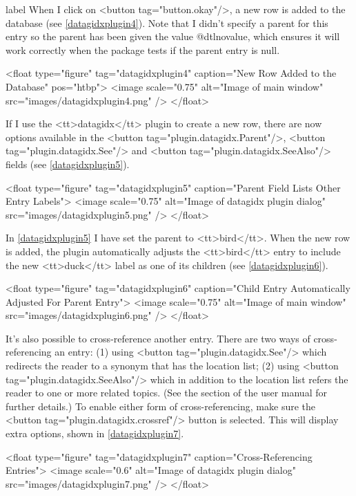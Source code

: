 \begin{example}{label}{}
   When I click on <button tag="button.okay"/>, a new row is
   added to the database (see \autoref{datagidxplugin4}). Note that
   I didn't specify a parent for this entry so the parent has
   been given the value \gls{@dtlnovalue}, which ensures it will work
   correctly when the  package tests if the parent entry
   is null.

     <float type="figure" tag="datagidxplugin4" caption="New Row Added to the Database" pos="htbp">
      <image scale="0.75" alt="Image of main window" src="images/datagidxplugin4.png" />
     </float>

   If I use the <tt>datagidx</tt> plugin to create a new row,
   there are now options available in the 
   <button tag="plugin.datagidx.Parent"/>, 
   <button tag="plugin.datagidx.See"/> and 
   <button tag="plugin.datagidx.SeeAlso"/> fields 
   (see \autoref{datagidxplugin5}).

     <float type="figure" tag="datagidxplugin5" caption="Parent Field Lists Other Entry Labels">
      <image scale="0.75" alt="Image of datagidx plugin dialog" src="images/datagidxplugin5.png" />
     </float>

   In \autoref{datagidxplugin5} I have set the parent to 
   <tt>bird</tt>. When the new row is added, the plugin automatically adjusts
   the <tt>bird</tt> entry to include the new <tt>duck</tt> label as one of its
   children (see \autoref{datagidxplugin6}).

     <float type="figure" tag="datagidxplugin6" caption="Child Entry Automatically Adjusted For Parent Entry">
      <image scale="0.75" alt="Image of main window" src="images/datagidxplugin6.png" />
     </float>

   It's also possible to cross-reference another entry. There are two ways
   of cross-referencing an entry: (1) using <button tag="plugin.datagidx.See"/>
   which redirects the reader to a synonym that has the location list;
   (2) using <button tag="plugin.datagidx.SeeAlso"/> which in addition to the
   location list refers the reader to one or more related topics. (See the
    section of the  user manual
   for further details.) To enable
   either form of cross-referencing, make sure the
   <button tag="plugin.datagidx.crossref"/> button is selected. This will 
   display extra options, shown in \autoref{datagidxplugin7}.

     <float type="figure" tag="datagidxplugin7" caption="Cross-Referencing Entries">
      <image scale="0.6" alt="Image of datagidx plugin dialog" src="images/datagidxplugin7.png" />
     </float>


\end{example}
